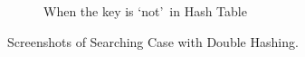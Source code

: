 \begin{itemize}
\begin{figure}[!ht]
\begin{subfigure}{0.45\textwidth}
			      \caption{When the key is `not'~in Hash Table}\label{fig:dblhashing-notfound-metric}
		      \end{subfigure}

		      \caption{Screenshots of Searching Case with Double Hashing.}\label{fig:dblhashing-search-metric}
	      \end{figure}
\end{itemize}